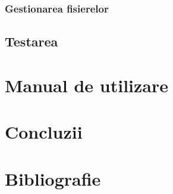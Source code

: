 \documentclass[12pt]{article}
\begin{document}
\subsubsection{Gestionarea fisierelor}

\subsection{Testarea}

\section{Manual de utilizare}

\section{Concluzii}

\newpage

\section{Bibliografie}
\nocite{owasp-top10-2017}
\nocite{owasp-top10-mobile}
\nocite{3ways-auth}
\nocite{rfc-7519}
\nocite{jwt}
\nocite{enisa-2017}
\nocite{enisa-security-data-processing}
\nocite{goldberg1998comparison}
\nocite{felt2017measuring}
\printbibliography[title=Bibliografie]
\end{document}
